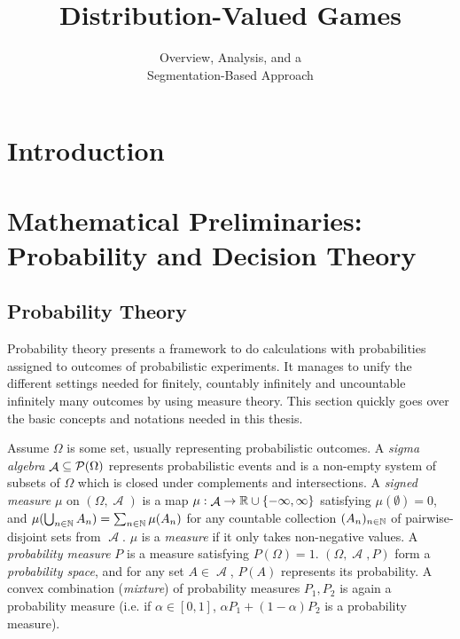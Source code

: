 \documentclass[a4paper]{scrreprt}
\title{\huge Distribution-Valued Games}
\subtitle{\LARGE Overview, Analysis, and a \\Segmentation-Based Approach}
\DeclareMathOperator{\A}{\mathcal{A}}
\newcommand{\Rp}{\mathbb{R}_{\geq 0}}
\theoremstyle{definition}
\begin{document}
    \maketitle
    \tableofcontents
    
    \chapter{Introduction}
    
    \chapter{Mathematical Preliminaries: Probability and Decision Theory}
    
    \todo{Introduce Notations $[n]$, $\Rp$}
    
    \section{Probability Theory}
    Probability theory presents a framework to do calculations with probabilities assigned to outcomes of probabilistic experiments. It manages to unify the different settings needed for finitely, countably infinitely and uncountable infinitely many outcomes by using measure theory. This section quickly goes over the basic concepts and notations needed in this thesis.
    
    Assume $\Omega$ is some set, usually representing probabilistic outcomes. 
    A \emph{sigma algebra} $\A \subseteq \Pot(\Omega)$ represents probabilistic events and is a non-empty system of subsets of $\Omega$ which is closed under complements and intersections.
    A \emph{signed measure} $\mu$ on $(\Omega, \A)$ is a map $\mu: \A \to \R \cup \set{-\infty, \infty}$ satisfying $\mu(\emptyset) = 0$, and $\mu(\bigcup_{n \in \mathbb{N}} A_n) = \sum_{n \in \mathbb{N}}\mu(A_n)$ for any countable collection $(A_n)_{n \in \mathbb{N}}$ of pairwise-disjoint sets from $\A$.
    $\mu$ is a \emph{measure} if it only takes non-negative values.
    A \emph{probability measure} $P$ is a measure satisfying $P(\Omega) = 1$.
    $(\Omega, \A, P)$ form a \emph{probability space}, and for any set $A \in \A$, $P(A)$ represents its probability.
    A convex combination (\emph{mixture}) of probability measures $P_1, P_2$ is again a probability measure (i.e. if $\alpha \in [0, 1]$, $\alpha P_1 + (1-\alpha) P_2$ is a probability measure).
    
\end{document}
